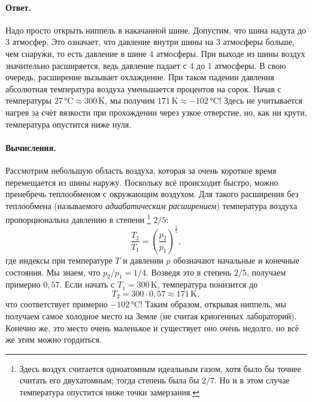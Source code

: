 \paragraph{Ответ.}
Надо просто открыть ниппель в накачанной шине.
Допустим, что шина надута до 3 атмосфер.
Это означает, что давление внутри шины на 3 атмосферы больше, чем снаружи, то есть давление в шине 4 атмосферы.
При выходе из шины воздух значительно расширяется, ведь давление падает с 4 до 1 атмосферы.
В свою очередь, расширение вызывает охлаждение.
При таком падении давления абсолютная температура воздуха уменьшается процентов на сорок.
Начав с температуры $27 \,\text{°C} \approx 300\, \text{K}$, мы получим $171 \,\text{K} \approx -102\, \text{°C}$!
Здесь не учитывается нагрев за счёт вязкости при прохождении через узкое отверстие, но, как ни крути, температура опустится ниже нуля.

\paragraph{Вычисления.}
Рассмотрим небольшую область воздуха, которая за очень короткое время перемещается из шины наружу.
Поскольку всё происходит быстро, можно пренебречь теплообменом с окружающим воздухом.
Для такого расширения без теплообмена (называемого \emph{адиабатическим расширением}) температура воздуха пропорциональна давлению в степени%
\footnote{Здесь воздух считается одноатомным идеальным газом, хотя было бы точнее
считать его двухатомным; тогда степень была бы $2/7$.
Но и в этом случае температура опустится ниже точки замерзания. \pr}
$2/5$:
\[\frac{T_2}{T_1}=\left(\frac{p_2}{p_1}\right)^{\tfrac{2}{5}},\]
где индексы при температуре $T$ и давлении $p$ обозначают начальные и конечные состояния.
Мы знаем, что $p_2/p_1=1/4$.
Возведя это в степень $2/5$, получаем примерно $0{,}57$.
Если начать с $T_1=300\,$K, температура понизится до
\[T_2=300 \cdot 0{,}57 \approx 171 \,\text{K},\]
что соответствует примерно $-102\, \text{°C}$!
Таким образом, открывая ниппель, мы получаем самое холодное место на Земле (не считая криогенных лабораторий).
Конечно же, это место очень маленькое и существует оно очень недолго, но всё же этим можно гордиться.
